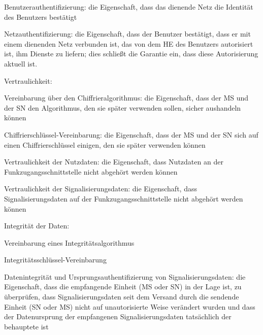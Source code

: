 \documentclass[a4paper]{article}
\begin{document}
\begin{multicols}{3}
\begin{itemize*}
            \begin{itemize*}
                  \item Benutzerauthentifizierung: die Eigenschaft, dass das dienende Netz die Identität des Benutzers bestätigt
                  \item Netzauthentifizierung: die Eigenschaft, dass der Benutzer bestätigt, dass er mit einem dienenden Netz verbunden ist, das von dem HE des Benutzers autorisiert ist, ihm Dienste zu liefern; dies schließt die Garantie ein, dass diese Autorisierung aktuell ist.
            \end{itemize*}
            \item
            Vertraulichkeit:

            \begin{itemize*}
                  \item Vereinbarung über den Chiffrieralgorithmus: die Eigenschaft, dass der MS und der SN den Algorithmus, den sie später verwenden sollen, sicher aushandeln können
                  \item Chiffrierschlüssel-Vereinbarung: die Eigenschaft, dass der MS und der SN sich auf einen Chiffrierschlüssel einigen, den sie später verwenden können
                  \item Vertraulichkeit der Nutzdaten: die Eigenschaft, dass Nutzdaten an der Funkzugangsschnittstelle nicht abgehört werden können
                  \item Vertraulichkeit der Signalisierungsdaten: die Eigenschaft, dass Signalisierungsdaten auf der Funkzugangsschnittstelle nicht abgehört werden können
            \end{itemize*}
            \item
            Integrität der Daten:

            \begin{itemize*}
                  \item Vereinbarung eines Integritätsalgorithmus
                  \item Integritätsschlüssel-Vereinbarung
                  \item Datenintegrität und Ursprungsauthentifizierung von Signalisierungsdaten: die Eigenschaft, dass die empfangende Einheit (MS oder SN) in der Lage ist, zu überprüfen, dass Signalisierungsdaten seit dem Versand durch die sendende Einheit (SN oder MS) nicht auf unautorisierte Weise verändert wurden und dass der Datenursprung der empfangenen Signalisierungsdaten tatsächlich der behauptete ist
            \end{itemize*}
      \end{itemize*}


\end{multicols}
\end{document}
